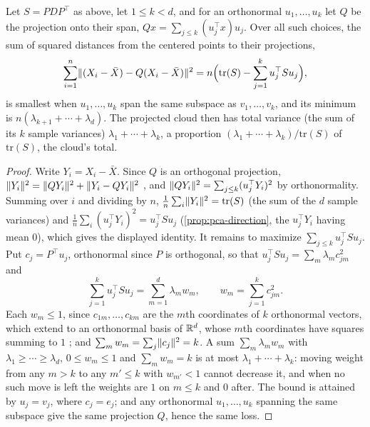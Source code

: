 \begin{theorem}
\label{thm:pca-projection}
Let $S = PDP^\top$ as above, let $1 \leq k < d$, and for an orthonormal $u_1, \ldots, u_k$ let $Q$ be the projection onto their span, $Qx = \sum_{j \leq k}(u_j^\top x)u_j$.
Over all such choices, the sum of squared distances from the centered points to their projections,
\[
\sum_{i=1}^n\lVert(X_i - \bar{X}) - Q(X_i - \bar{X})\rVert^2 = n\Big(\mathrm{tr}(S) - \sum_{j=1}^k u_j^\top Su_j\Big),
\]
is smallest when $u_1, \ldots, u_k$ span the same subspace as $v_1, \ldots, v_k$, and its minimum is $n(\lambda_{k+1} + \cdots + \lambda_d)$.
The projected cloud then has total variance (the sum of its $k$ sample variances) $\lambda_1 + \cdots + \lambda_k$, a proportion $(\lambda_1 + \cdots + \lambda_k)/\mathrm{tr}(S)$ of $\mathrm{tr}(S)$, the cloud's total.
\end{theorem}
\begin{proof}
Write $Y_i = X_i - \bar{X}$.
Since $Q$ is an orthogonal projection, $\lVert Y_i\rVert^2 = \lVert QY_i\rVert^2 + \lVert Y_i - QY_i\rVert^2$ , and $\lVert QY_i\rVert^2 = \sum_{j \leq k}(u_j^\top Y_i)^2$ by orthonormality.
Summing over $i$ and dividing by $n$, $\frac1n\sum_i\lVert Y_i\rVert^2 = \mathrm{tr}(S)$ (the sum of the $d$ sample variances) and $\frac1n\sum_i(u_j^\top Y_i)^2 = u_j^\top Su_j$ (\cref{prop:pca-direction}, the $u_j^\top Y_i$ having mean $0$), which gives the displayed identity.
It remains to maximize $\sum_{j \leq k}u_j^\top Su_j$.
Put $c_j = P^\top u_j$, orthonormal since $P$ is orthogonal, so that $u_j^\top Su_j = \sum_m\lambda_mc_{jm}^2$ and
\[
\sum_{j=1}^k u_j^\top Su_j = \sum_{m=1}^d\lambda_mw_m, \qquad w_m = \sum_{j=1}^k c_{jm}^2.
\]
Each $w_m \leq 1$, since $c_{1m}, \ldots, c_{km}$ are the $m$th coordinates of $k$ orthonormal vectors, which extend to an orthonormal basis of $\mathbb{R}^d$, whose $m$th coordinates have squares summing to $1$ ; and $\sum_mw_m = \sum_j\lVert c_j\rVert^2 = k$.
A sum $\sum_m\lambda_mw_m$ with $\lambda_1 \geq \cdots \geq \lambda_d$, $0 \leq w_m \leq 1$ and $\sum_mw_m = k$ is at most $\lambda_1 + \cdots + \lambda_k$: moving weight from any $m > k$ to any $m' \leq k$ with $w_{m'} < 1$ cannot decrease it, and when no such move is left the weights are $1$ on $m \leq k$ and $0$ after.
The bound is attained by $u_j = v_j$, where $c_j = e_j$; and any orthonormal $u_1, \ldots, u_k$ spanning the same subspace give the same projection $Q$, hence the same loss.
\end{proof}

